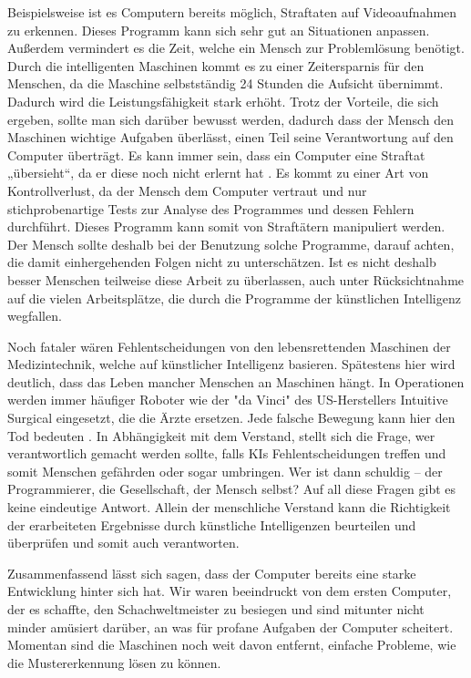 Beispielsweise ist es Computern bereits möglich, Straftaten auf Videoaufnahmen zu erkennen. Dieses Programm kann sich sehr gut an Situationen anpassen. Außerdem vermindert es die Zeit, welche ein Mensch zur Problemlösung benötigt. Durch die intelligenten Maschinen kommt es zu einer Zeitersparnis für den Menschen, da die Maschine selbstständig 24 Stunden die Aufsicht übernimmt. Dadurch wird die Leistungsfähigkeit stark erhöht. Trotz der Vorteile, die sich ergeben, sollte man sich darüber bewusst werden, dadurch dass der Mensch den Maschinen wichtige Aufgaben überlässt, einen Teil seine Verantwortung auf den Computer überträgt. Es kann immer sein, dass ein Computer eine Straftat „übersieht“, da er diese noch nicht erlernt hat \cite{UniversitaetHamburg_1}. Es kommt zu einer Art von Kontrollverlust, da der Mensch dem Computer vertraut und nur stichprobenartige Tests zur Analyse des Programmes und dessen Fehlern durchführt. Dieses Programm kann somit von Straftätern manipuliert werden. Der Mensch sollte deshalb bei der Benutzung solche Programme, darauf achten, die damit einhergehenden Folgen nicht zu unterschätzen. Ist es nicht deshalb besser Menschen teilweise diese Arbeit zu überlassen, auch unter Rücksichtnahme auf die vielen Arbeitsplätze, die durch die Programme der künstlichen Intelligenz wegfallen. 

Noch fataler wären Fehlentscheidungen von den lebensrettenden Maschinen der Medizintechnik, welche auf künstlicher Intelligenz basieren. Spätestens hier wird deutlich, dass das Leben mancher Menschen an Maschinen hängt.  In Operationen werden immer häufiger Roboter wie der "da Vinci" des US-Herstellers Intuitive Surgical eingesetzt, die die Ärzte ersetzen. Jede falsche Bewegung kann hier den Tod bedeuten \cite{Spiegel_1}.
In Abhängigkeit mit dem Verstand, stellt sich die Frage, wer verantwortlich gemacht werden sollte, falls KIs Fehlentscheidungen treffen und somit Menschen gefährden oder sogar umbringen. Wer ist dann schuldig – der Programmierer, die Gesellschaft, der Mensch selbst? Auf all diese Fragen gibt es keine eindeutige Antwort. Allein der menschliche Verstand kann die Richtigkeit der erarbeiteten Ergebnisse durch künstliche Intelligenzen beurteilen und überprüfen und somit auch verantworten. 

Zusammenfassend lässt sich sagen, dass der Computer bereits eine starke Entwicklung hinter sich hat. Wir waren beeindruckt von dem ersten Computer, der es schaffte, den Schachweltmeister zu besiegen und sind mitunter nicht minder amüsiert darüber, an was für profane Aufgaben der Computer scheitert. Momentan sind die Maschinen noch weit davon entfernt, einfache Probleme, wie die Mustererkennung lösen zu können.

